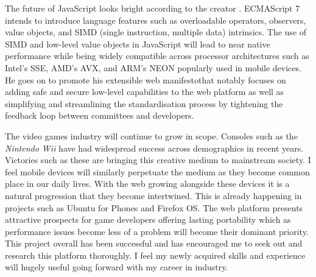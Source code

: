\documentclass[final]{cmpreport}
\begin{document}
The future of JavaScript looks bright according to the creator \citet{Eich}. ECMAScript 7 intends to introduce language features such as overloadable operators, observers, value objects, and SIMD (single instruction, multiple data) intrinsics. The use of SIMD and low-level value objects in JavaScript will lead to near native performance while being widely compatible across processor architectures such as Intel's SSE, AMD's AVX, and ARM's NEON popularly used in mobile devices. He goes on to promote his extensible web manifesto\footnotemark that notably focuses on adding safe and secure low-level capabilities to the web platform as well as simplifying and streamlining the standardisation process by tightening the feedback loop between committees and developers.


The video games industry will continue to grow in scope. Consoles such as the \textit{Nintendo Wii} have had widespread success across demographics in recent years. Victories such as these are bringing this creative medium to mainstream society. I feel mobile devices will similarly perpetuate the medium as they become common place in our daily lives. With the web growing alongside these devices it is a natural progression that they become intertwined. This is already happening in projects such as Ubuntu for Phones and Firefox OS. The web platform presents attractive prospects for game developers offering lasting portability which as performance issues become less of a problem will become their dominant priority. This project overall has been successful and has encouraged me to seek out and research this platform thoroughly. I feel my newly acquired skills and experience will hugely useful going forward with my career in industry.

\clearpage

\end{document}
